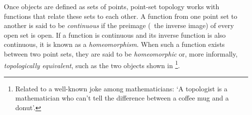 Once objects are defined as sets of points, point-set topology works with functions that relate these sets to each other.
A function from one point set to another is said to be \emph{continuous} if the preimage (\ie\ the inverse image) of every open set is open.
If a function is continuous and its inverse function is also continuous, it is known as a \emph{homeomorphism}.
When such a function exists between two point sets, they are said to be \emph{homeomorphic} or, more informally, \emph{topologically equivalent}, such as the two objects shown in \footnote{Related to a well-known joke among mathematicians: `A topologist is a mathematician who can't tell the difference between a coffee mug and a donut'.}.

\begin{figure}[b]
\centering
{} \quad
{}

\end{figure}
